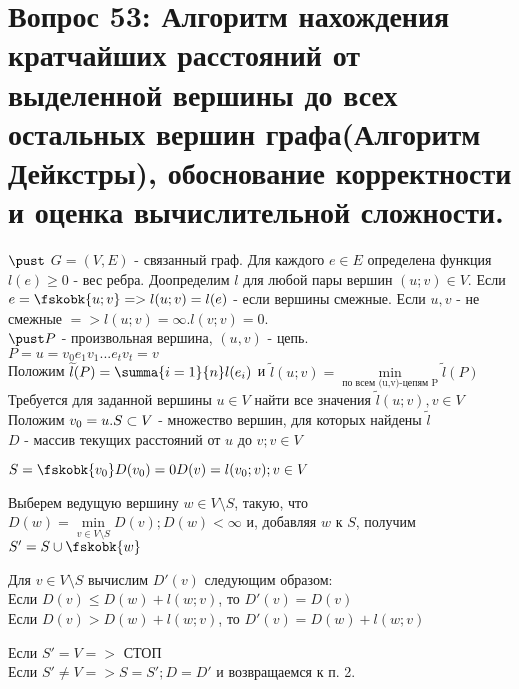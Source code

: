 \section{Вопрос 53: Алгоритм нахождения кратчайших расстояний от выделенной вершины до всех остальных вершин графа(Алгоритм Дейкстры), обоснование корректности и оценка вычислительной сложности.}

$\pust$ $G = (V, E)$ - связанный граф. Для каждого $e \in E$ определена функция $l(e) \geq 0$ - вес ребра. Доопределим $l$ для любой пары вершин $(u; v) \in  V$. Если $e= \fskobk{u;v} => l(u; v) = l(e)$ - если вершины смежные. Если $u, v$ - не смежные $=> l(u; v) = \infty. l(v; v) = 0.$
\\$\pust P$ - произвольная вершина, $(u, v)$ - цепь.
\\$P = u = v_0 e_1 v_1 ... e_t v_t = v$
\\Положим $\widetilde{l}(P)=\summa{i=1}{n}l(e_i)$ и $\widetilde{l}(u; v) = \min\limits_{\text{по всем (u,v)-цепям P}}\widetilde{l}(P)$
\\Требуется для заданной вершины $u \in V$ найти все значения $\widetilde{l}(u; v), v \in V$
\\Положим $v_0=u.
\\S \subset V$ - множество вершин, для которых найдены $\widetilde{l}$
\\$D$ - массив текущих расстояний от $u$ до $v; v \in V$ 

\begin{enumerate*}
	\item $S=\fskobk{v_0}\\
	D(v_0) = 0\\
	D(v) = l(v_0; v); v \in V$

	\item Выберем ведущую вершину $w \in V\setminus S$, такую, что $D(w)=\min\limits_{v \in V\setminus S}D(v); D(w) < \infty$ и, добавляя $w$ к $S$, получим $S'=S \cup \fskobk{w}$

	\item Для $v \in V \setminus S$ вычислим $D'(v)$ следующим образом:\\
	Если $D(v) \leq D(w) + l(w; v)$, то $D'(v)=D(v)$\\
	Если $D(v) > D(w) + l(w; v)$, то $D'(v)=D(w) + l(w; v)$
	
	\item Если $S' = V =>$ СТОП\\
	Если $S' \neq V => S = S'; D = D'$ и возвращаемся к п. 2.
\end{enumerate*}

